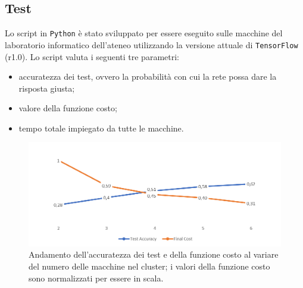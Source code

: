 \documentclass[DIV=calc, paper=a4, fontsize=11pt]{scrartcl}	 %
\begin{document}
\begin{multicols}{2}
		\subsection{Test}
			Lo script in \texttt{Python} è stato sviluppato per essere eseguito sulle macchine del laboratorio informatico dell'ateneo utilizzando la versione attuale di \texttt{TensorFlow} (r1.0). Lo script valuta i seguenti tre parametri:
			\begin{itemize}
				\item accuratezza dei test, ovvero la probabilità con cui la rete possa dare la risposta giusta;
				\item valore della funzione costo;
				\item tempo totale impiegato da tutte le macchine.
			\end{itemize}
		\begin{figure}[th]
			\centering
			\includegraphics[scale=.95]{img/accuracy-cost.png}
			\caption{Andamento dell'accuratezza dei test e della funzione costo al variare del numero delle macchine nel cluster; i valori della funzione costo sono normalizzati per essere in scala.}
			\label{fig:accuracy-cost}
		\end{figure}
			

\end{multicols}
\end{document}
